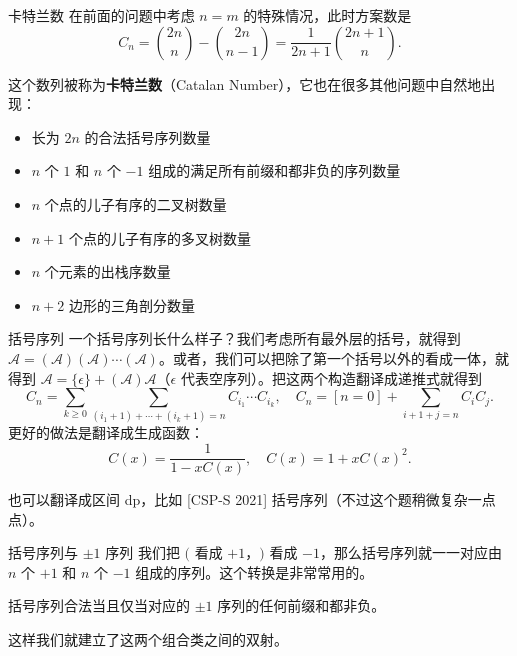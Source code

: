 \begin{frame}{卡特兰数}
    在前面的问题中考虑 $n=m$ 的特殊情况，此时方案数是 
    $$
    C_n=\binom{2n}{n}-\binom{2n}{n-1}=\frac{1}{2n+1}\binom{2n+1}{n}.
    $$
    
    这个数列被称为\textbf{卡特兰数}（Catalan Number），它也在很多其他问题中自然地出现：

    \begin{itemize}
        \item 长为 $2n$ 的合法括号序列数量
        \item $n$ 个 $1$ 和 $n$ 个 $-1$ 组成的满足所有前缀和都非负的序列数量
        \item $n$ 个点的儿子有序的二叉树数量
        \item $n+1$ 个点的儿子有序的多叉树数量
        \item $n$ 个元素的出栈序数量
        \item $n+2$ 边形的三角剖分数量
    \end{itemize}
\end{frame}
\begin{frame}{括号序列}
    一个括号序列长什么样子？我们考虑所有最外层的括号，就得到 $\mathcal A=(\mathcal A)(\mathcal A)\cdots (\mathcal A)$。或者，我们可以把除了第一个括号以外的看成一体，就得到 $\mathcal A=\{\epsilon\}+(\mathcal A)\mathcal A$（$\epsilon$ 代表空序列）。把这两个构造翻译成递推式就得到
    $$
    C_n=\sum_{k\ge 0}\sum_{(i_1+1)+\cdots+(i_k+1)=n}C_{i_1}\cdots C_{i_k},\quad C_n=[n=0]+\sum_{i+1+j=n}C_{i}C_j.
    $$
    更好的做法是翻译成生成函数：
    $$
    C(x)=\frac{1}{1-xC(x)},\quad C(x)=1+xC(x)^2.
    $$

    也可以翻译成区间 dp，比如 [CSP-S 2021] 括号序列（不过这个题稍微复杂一点点）。
\end{frame}
\begin{frame}{括号序列与 $\pm 1$ 序列}
    我们把 $($ 看成 $+1$，$)$ 看成 $-1$，那么括号序列就一一对应由 $n$ 个 $+1$ 和 $n$ 个 $-1$ 组成的序列。这个转换是非常常用的。
    \begin{theorem}
        括号序列合法当且仅当对应的 $\pm 1$ 序列的任何前缀和都非负。
    \end{theorem}
    这样我们就建立了这两个组合类之间的双射。
\end{frame}
